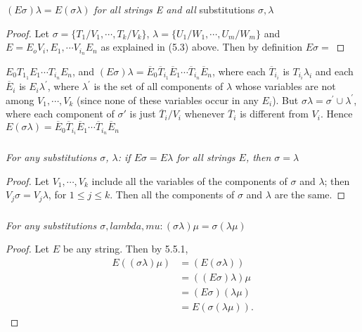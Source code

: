 \documentclass[8pt]{extarticle}
\begin{document}
\subsubsection{}
$(E\sigma)\lambda = E(\sigma\lambda)$ \emph{for all strings E and all} substitutions $\sigma, \lambda$

\begin{proof}
Let $\sigma = \{T_1/V_1,\dotsm,T_k/V_k\}$, $\lambda = \{U_1/W_1,\dotsm,U_m/W_m\}$ and\\$E = E_oV_i,E_1,\dotsm V_{i_n}E_n$ as explained in (5.3) above. Then by definition $E\sigma =$
\end{proof}

\newpage
$E_0T_{1_1}E_1\dotsm T_{i_n}E_n$, and $(E\sigma)\lambda = \overline{E}_0\overline{T}_{i_1}\overline{E}_1\dotsm\overline{T}_{i_n}\overline{E}_n$, where each $\overline{T}_{i_i}$ is $T_{i_i}\lambda_i$ and each $\overline{E}_i$ is $E_i\lambda^\prime$, where $\lambda^\prime$ is the set of all components of $\lambda$ whose variables are not among $V_1,\dotsm,V_k$ (since none of these variables occur in any $E_i$). But $\sigma\lambda = \sigma^\prime \cup \lambda^\prime$, where each component of $\sigma\prime$ is just $\overline{T}_i/V_i$ whenever $\overline{T}_i$ is different from $V_i$. Hence $E(\sigma\lambda) = \overline{E}_0\overline{T}_{i_i}\overline{E}_1\dotsm\overline{T}_{i_n}\overline{E}_n$

\subsubsection{}
\emph{For any substitutions $\sigma$, $\lambda$: if $E\sigma = E\lambda$ for all strings $E$, then $\sigma = \lambda$}
\begin{proof}
Let $V_1,\dotsm,V_k$ include all the variables of the components of $\sigma$ and $\lambda$; then $V_j\sigma = V_j\lambda$, for $1 \leq j \leq k$. Then all the components of $\sigma$ and $\lambda$ are the same.
\end{proof}

\subsubsection{}
\emph{For any substitutions $\sigma, lambda, mu: (\sigma\lambda)\mu = \sigma(\lambda\mu)$}
\begin{proof}
Let $E$ be any string. Then by 5.5.1,
\begin{align*}
    E((\sigma\lambda)\mu) &= (E(\sigma\lambda))\\
                          &= ((E\sigma)\lambda)\mu\\
                          &= (E\sigma)(\lambda\mu)\\
                          &= E(\sigma(\lambda\mu)).
\end{align*}
\end{proof}
\end{document}
